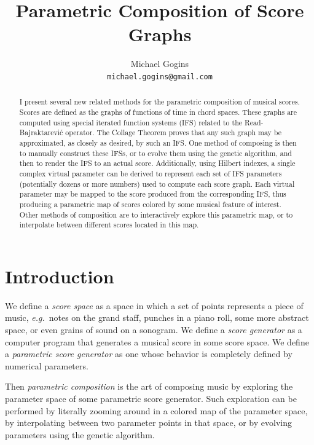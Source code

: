 \documentclass[english,11pt,letterpaper,onecolumn]{scrartcl}
\numberwithin{equation}{section}
\begin{document}
\title{Parametric Composition of Score Graphs}
\author{Michael Gogins \\ \texttt{michael.gogins@gmail.com}}
\maketitle

\begin{abstract}
I present several new related methods for the parametric composition of musical
scores. Scores are defined as the graphs of functions of time in chord spaces.
These graphs are computed using special iterated function systems (IFS) related
to the Read-Bajraktarevi\'c operator. The Collage Theorem proves that any such
graph may be approximated, as closely as desired, by such an IFS. One method of
composing is then to manually construct these IFSs, or to evolve them using the
genetic algorithm, and then to render the IFS to an actual score. Additionally,
using Hilbert indexes, a single complex virtual parameter can be derived to
represent each set of IFS parameters (potentially dozens or more numbers) used
to compute each score graph. Each virtual parameter may be mapped to the score
produced from the corresponding IFS, thus producing a parametric map of scores
colored by some musical feature of interest. Other methods of composition are to
interactively explore this parametric map, or to interpolate between different
scores located in this map.
\end{abstract}


\section{Introduction}

We define a \textit{score space} as a space in which a set of points represents
a piece of music, \textit{e.g.}\ notes on the grand staff, punches in a piano
roll, some more abstract space, or even grains of sound on a sonogram. We
define a \textit{score generator} as a computer program that generates a
musical score in some score space. We define a \textit{parametric score
generator} as one whose behavior is completely defined by numerical parameters.

Then \textit{parametric composition} is the art of composing music by exploring
the parameter space of some parametric score generator. Such exploration can be
performed by literally zooming around in a colored map of the parameter space,
by interpolating between two parameter points in that space, or by evolving
parameters using the genetic algorithm.
\end{document}
